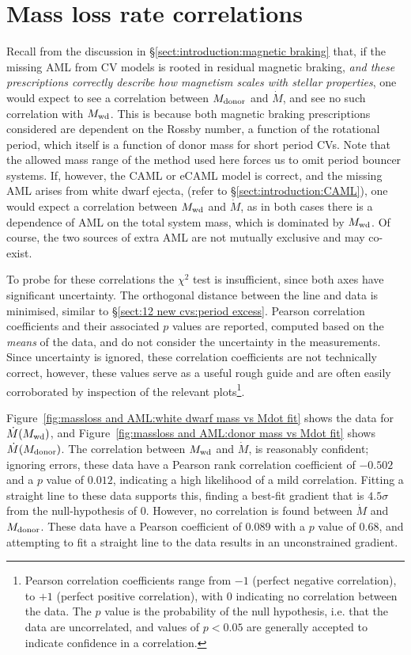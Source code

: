 \newpage
\section{Mass loss rate correlations}
\label{sect:massloss and AML:mass loss rate correlations}

Recall from the discussion in \S\ref{sect:introduction:magnetic braking} that, if the missing AML from CV models is rooted in residual magnetic braking, \textit{and these prescriptions correctly describe how magnetism scales with stellar properties}, one would expect to see a correlation between $M_{\rm donor}$ and $\dot M$, and see no such correlation with $M_{\rm wd}$.
This is because both magnetic braking prescriptions considered are dependent on the Rossby number, a function of the rotational period, which itself is a function of donor mass for short period CVs. Note that the allowed mass range of the method used here forces us to omit period bouncer systems.
If, however, the CAML or eCAML model is correct, and the missing AML arises from white dwarf ejecta, (refer to \S\ref{sect:introduction:CAML}), one would expect a correlation between $M_{\rm wd}$ and $\dot M$, as in both cases there is a dependence of AML on the total system mass, which is dominated by $M_{\rm wd}$.
Of course, the two sources of extra AML are not mutually exclusive and may co-exist.

To probe for these correlations the $\chi^2$ test is insufficient, since both axes have significant uncertainty. The orthogonal distance between the line and data is minimised, similar to \S\ref{sect:12 new cvs:period excess}.
Pearson correlation coefficients and their associated $p$ values are reported, computed based on the \textit{means} of the data, and do not consider the uncertainty in the measurements. Since uncertainty is ignored, these correlation coefficients are not technically correct, however, these values serve as a useful rough guide and are often easily corroborated by inspection of the relevant plots\footnote{Pearson correlation coefficients range from $-1$ (perfect negative correlation), to $+1$ (perfect positive correlation), with 0 indicating no correlation between the data. The $p$ value is the probability of the null hypothesis, i.e. that the data are uncorrelated, and values of $p < 0.05$ are generally accepted to indicate confidence in a correlation.}.

Figure~\ref{fig:massloss and AML:white dwarf mass vs Mdot fit} shows the data for $\dot M(M_{\rm wd})$, and Figure~\ref{fig:massloss and AML:donor mass vs Mdot fit} shows $\dot M(M_{\rm donor})$.
The correlation between $M_{\rm wd}$ and $\dot M$, is reasonably confident; ignoring errors, these data have a Pearson rank correlation coefficient of $-0.502$ and a $p$ value of $0.012$, indicating a high likelihood of a mild correlation. Fitting a straight line to these data supports this, finding a best-fit gradient that is $4.5\sigma$ from the null-hypothesis of 0.
However, no correlation is found between $\dot M$ and $M_{\rm donor}$. These data have a Pearson coefficient of $0.089$ with a $p$ value of $0.68$, and attempting to fit a straight line to the data results in an unconstrained gradient.

